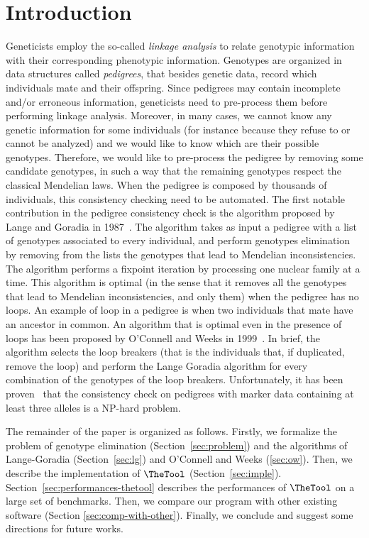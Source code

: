 \section{Introduction}
\label{sec:intro}
Geneticists employ the so-called \emph{linkage analysis} to relate genotypic
information with their corresponding phenotypic information.  Genotypes are
organized in data structures called \emph{pedigrees}, that besides genetic data,
record which individuals mate and their offspring. Since pedigrees may contain
incomplete and/or erroneous information, geneticists need to pre-process them
before performing linkage analysis.  Moreover, in many cases, we cannot know any
genetic information for some individuals (for instance because they refuse to or
cannot be analyzed) and we would like to know which are their possible
genotypes. Therefore, we would like to pre-process the pedigree by removing some
candidate genotypes, in such a way that the remaining genotypes respect the
classical Mendelian laws. When the pedigree is composed by thousands of
individuals, this consistency checking need to be automated. The first notable
contribution in the pedigree consistency check is the algorithm proposed by
Lange and Goradia in 1987~\cite{LangeGoradia1987}. The algorithm takes as input
a pedigree with a list of genotypes associated to every individual, and perform
genotypes elimination by removing from the lists the genotypes that lead to
Mendelian inconsistencies. The algorithm performs a fixpoint iteration by
processing one nuclear family at a time. This algorithm is optimal (in the
sense that it removes all the genotypes that lead to Mendelian
inconsistencies, and only them) when the pedigree has no loops. An example of
loop in a pedigree is 
when two individuals that mate have an ancestor in common. An algorithm that is
optimal even in the presence of loops has been proposed by O'Connell and Weeks
in 1999~\cite{OConnellWeeks1999}. In brief, the algorithm selects the loop
breakers (that is the individuals that, if duplicated, remove the loop) and
perform the Lange Goradia algorithm for every combination of the genotypes of
the loop breakers. Unfortunately, it has been proven~\cite{Aceto2004} that the
consistency check on pedigrees with marker data containing at least three
alleles is a NP-hard problem.


The remainder of the paper is organized as follows. Firstly, we formalize the
problem of genotype elimination (Section~\ref{sec:problem}) and the algorithms of
Lange-Goradia (Section~\ref{sec:lg}) and O'Connell and Weeks
(\ref{sec:ow}). Then, we describe the implementation of {$\TheTool$}
(Section~\ref{sec:imple}). Section~\ref{sec:performances-thetool} describes the
performances of {$\TheTool$} on a large set of benchmarks. Then, we compare our
program with other existing software (Section
\ref{sec:comp-with-other}). Finally, we conclude and suggest some directions for
future works.

